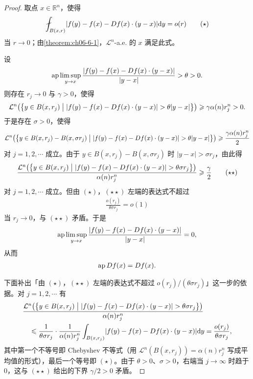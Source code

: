 \documentclass[../../main.tex]{subfiles}%
\begin{document}
\begin{proof}
取点 $x\in\mathbb{R}^n$，使得
\begin{align*}
\fint_{B(x,r)}\lvert f(y)-f(x)-Df(x)\cdot(y-x)\rvert\diff y=o(r)\qquad(\star)
\end{align*}
当 $r\to0$；由\cref{theorem:ch06-6-1}，$\mathcal{L}^n$-a.e. 的 $x$ 满足此式。%

设
\begin{align*}
\operatorname{ap}\limsup_{y\to x}\frac{\lvert f(y)-f(x)-Df(x)\cdot(y-x)\rvert}{\lvert y-x\rvert}>\theta>0 .
\end{align*}
则存在 $r_j\to0$ 与 $\gamma>0$，使得
\begin{align*}
\mathcal{L}^n\bigl(\bigl\{y\in B(x,r_j)\bigm\lvert\lvert f(y)-f(x)-Df(x)\cdot(y-x)\rvert>\theta\lvert y-x\rvert\bigr\}\bigr)\geqslant\gamma\alpha(n)r_j^n>0 .
\end{align*}
于是存在 $\sigma>0$，使得
\begin{align*}
\mathcal{L}^n\bigl(\bigl\{y\in B(x,r_j)-B(x,\sigma r_j)\bigm\lvert\lvert f(y)-f(x)-Df(x)\cdot(y-x)\rvert>\theta\lvert y-x\rvert\bigr\}\bigr)\geqslant\frac{\gamma\alpha(n)r_j^n}{2}
\end{align*}
对 $j=1,2,\cdots$ 成立。由于 $y\in B(x,r_j)-B(x,\sigma r_j)$ 时 $\lvert y-x\rvert>\sigma r_j$，由此得
\begin{align*}
\frac{\mathcal{L}^n\bigl(\bigl\{y\in B(x,r_j)\bigm\lvert\lvert f(y)-f(x)-Df(x)\cdot(y-x)\rvert>\theta\sigma r_j\bigr\}\bigr)}{\alpha(n)r_j^n}\geqslant\frac{\gamma}{2}\qquad(\star\star)
\end{align*}
对 $j=1,2,\cdots$ 成立。但由 $(\star)$，$(\star\star)$ 左端的表达式不超过
\begin{align*}
\frac{o(r_j)}{\theta\sigma r_j}=o(1)
\end{align*}
当 $r_j\to0$，与 $(\star\star)$ 矛盾。于是
\begin{align*}
\operatorname{ap}\limsup_{y\to x}\frac{\lvert f(y)-f(x)-Df(x)\cdot(y-x)\rvert}{\lvert y-x\rvert}=0,
\end{align*}
从而
\begin{align*}
\operatorname{ap} Df(x)=Df(x).
\end{align*}

下面补出「由 $(\star)$，$(\star\star)$ 左端的表达式不超过 $o(r_j)/(\theta\sigma r_j)$」这一步的依据。对 $j=1,2,\cdots$ 有
\begin{align*}
&\frac{\mathcal{L}^n\bigl(\bigl\{y\in B(x,r_j)\bigm\lvert\lvert f(y)-f(x)-Df(x)\cdot(y-x)\rvert>\theta\sigma r_j\bigr\}\bigr)}{\alpha(n)r_j^n}\\
&\quad\leqslant\frac{1}{\theta\sigma r_j}\cdot\frac{1}{\alpha(n)r_j^n}\int_{B(x,r_j)}\lvert f(y)-f(x)-Df(x)\cdot(y-x)\rvert\mathrm{d} y=\frac{o(r_j)}{\theta\sigma r_j},
\end{align*}
其中第一个不等号即 Chebyshev 不等式（用 $\mathcal{L}^n(B(x,r_j))=\alpha(n)r_j^n$ 写成平均值的形式），最后一个等号即 $(\star)$。由于 $\theta>0$、$\sigma>0$，右端当 $j\to\infty$ 时趋于 $0$，这与 $(\star\star)$ 给出的下界 $\gamma/2>0$ 矛盾。
\end{proof}
\end{document}
